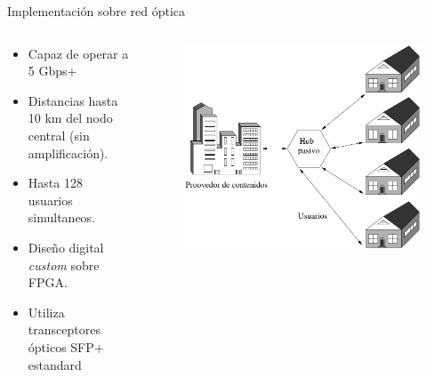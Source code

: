 \documentclass[aspectratio=169]{beamer}
\begin{document}
\begin{frame}{Implementación sobre red \color{red}óptica}

\begin{columns}
  \begin{column}{0.50\textwidth}

\begin{itemize}
 \item Capaz de operar a 5 Gbps+
 \item Distancias hasta 10 km del nodo central (sin amplificación).
 \item Hasta 128 usuarios simultaneos.
 \item Diseño digital \textit{custom} sobre FPGA.
 \item Utiliza transceptores ópticos SFP+ estandard
 \end{itemize}

  \end{column}
  \begin{column}{0.50\textwidth}

 
\begin{figure}[t]
  \centering
  \includegraphics[width=0.85 \textwidth]{../graphs/ftth.pdf} 
\end{figure}

  \end{column}
\end{columns}


\end{frame}

\end{document}
